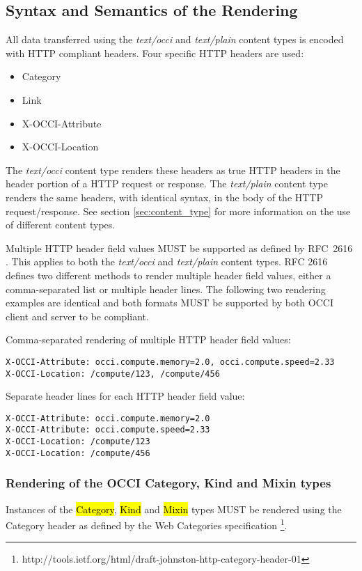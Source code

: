 \documentclass[10pt,a4paper]{article}
\begin{document}
\subsection{Syntax and Semantics of the Rendering}
\label{sec:syntax}
All data transferred using the \textit{text/occi} and
\textit{text/plain} content types is encoded with HTTP \cite{rfc2616}
compliant headers. Four specific HTTP headers are used:
\begin{itemize}
\item Category
\item Link
\item X-OCCI-Attribute
\item X-OCCI-Location
\end{itemize}
The \textit{text/occi} content type renders these headers as true HTTP
headers in the header portion of a HTTP request or response. The
\textit{text/plain} content type renders the same headers, with
identical syntax, in the body of the HTTP request/response. See
section \ref{sec:content_type} for more information on the use of
different content types.

Multiple HTTP header field values MUST be supported as defined by
RFC~2616 \cite{rfc2616}. This applies to both the \textit{text/occi}
and \textit{text/plain} content types. RFC 2616 defines two different
methods to render multiple header field values, either a
comma-separated list or multiple header lines. The following two
rendering examples are identical and both formats MUST be supported by
both OCCI client and server to be compliant.

Comma-separated rendering of multiple HTTP header field values:
\begin{verbatim}
X-OCCI-Attribute: occi.compute.memory=2.0, occi.compute.speed=2.33
X-OCCI-Location: /compute/123, /compute/456
\end{verbatim}

Separate header lines for each HTTP header field value:
\begin{verbatim}
X-OCCI-Attribute: occi.compute.memory=2.0
X-OCCI-Attribute: occi.compute.speed=2.33
X-OCCI-Location: /compute/123
X-OCCI-Location: /compute/456
\end{verbatim}

\subsubsection{Rendering of the OCCI Category, Kind and Mixin types}
Instances of the \hl{Category}, \hl{Kind} and \hl{Mixin} types
\cite{occi:core} MUST be rendered using the Category header as defined
by the Web Categories specification
\footnote{http://tools.ietf.org/html/draft-johnston-http-category-header-01}.
\end{document}

